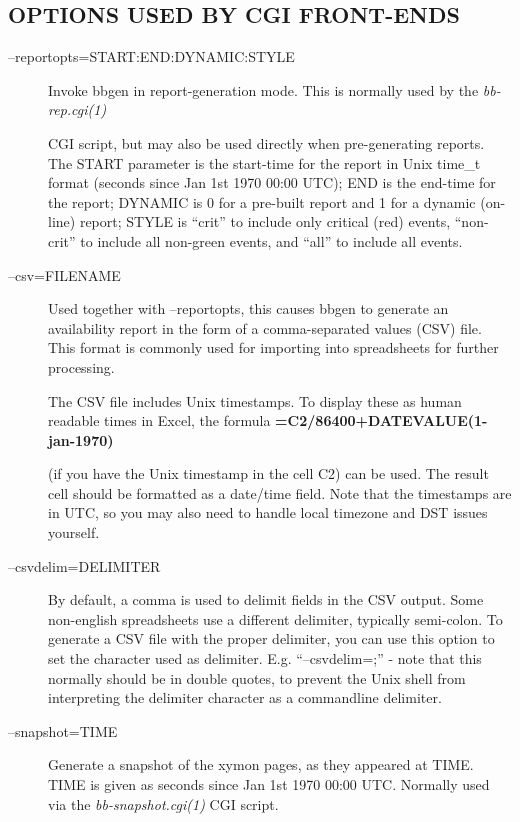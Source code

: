 \subsection{OPTIONS USED BY CGI FRONT-ENDS}
\begin{description}
\item[--reportopts=START:END:DYNAMIC:STYLE] Invoke bbgen in
  report-generation mode. This is normally used by the
  \emph{bb-rep.cgi(1)}

 CGI script, but may also be used directly when pre-generating
 reports. The START parameter is the start-time for the report in Unix
 time\_t format (seconds since Jan 1st 1970 00:00 UTC); END is the
 end-time for the report; DYNAMIC is 0 for a pre-built report and 1
 for a dynamic (on-line) report; STYLE is ``crit'' to include only
 critical (red) events, ``non-crit'' to include all non-green events,
 and ``all'' to include all events. 


 

\item[--csv=FILENAME] Used together with --reportopts, this causes
  bbgen to generate an availability report in the form of a
  comma-separated values (CSV) file. This format is commonly used for
  importing into spreadsheets for further processing.  

 The CSV file includes Unix timestamps. To display these as human
 readable times in Excel, the formula
 \textbf{=C2/86400+DATEVALUE(1-jan-1970)}

 (if you have the Unix timestamp in the cell C2) can be used. The
 result cell should be formatted as a date/time field. Note that the
 timestamps are in UTC, so you may also need to handle local timezone
 and DST issues yourself. 


 

\item[--csvdelim=DELIMITER] By default, a comma is used to delimit
  fields in the CSV output. Some non-english spreadsheets use a
  different delimiter, typically semi-colon. To generate a CSV file
  with the proper delimiter, you can use this option to set the
  character used as delimiter. E.g. ``--csvdelim=;'' - note that this
  normally should be in double quotes, to prevent the Unix shell from
  interpreting the delimiter character as a commandline delimiter. 



\item[--snapshot=TIME] Generate a snapshot of the xymon pages, as
  they appeared at TIME. TIME is given as seconds since Jan 1st 1970
  00:00 UTC. Normally used via the \emph{bb-snapshot.cgi(1)} CGI script. 

 


\end{description}
